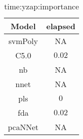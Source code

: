 \begin{table}[!ht]
	\centering
	\begin{tabular}{|c|c|}
		\hline
		Model & elapsed \\ \hline
		svmPoly & NA \\ \hline
		C5.0 & $0.02$ \\ \hline
		nb & NA \\ \hline
		nnet & NA \\ \hline
		pls & $0$ \\ \hline
		fda & $0.02$ \\ \hline
		pcaNNet & NA \\ \hline
	\end{tabular}
	\caption{time:yzap:importance}
	\label{tab:time:yzap:importance}
\end{table}
